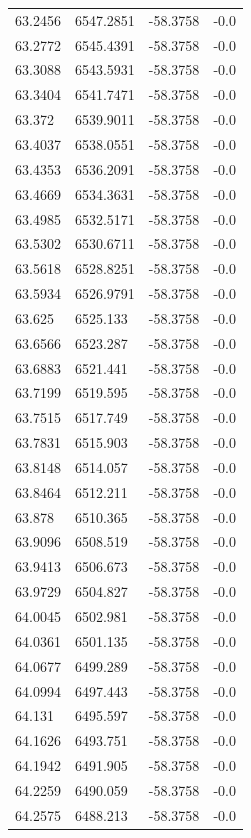 \begin{table}[H]
\begin{tabular}{llll}
63.2456 & 6547.2851 & -58.3758 & -0.0 \\
63.2772 & 6545.4391 & -58.3758 & -0.0 \\
63.3088 & 6543.5931 & -58.3758 & -0.0 \\
63.3404 & 6541.7471 & -58.3758 & -0.0 \\
63.372 & 6539.9011 & -58.3758 & -0.0 \\
63.4037 & 6538.0551 & -58.3758 & -0.0 \\
63.4353 & 6536.2091 & -58.3758 & -0.0 \\
63.4669 & 6534.3631 & -58.3758 & -0.0 \\
63.4985 & 6532.5171 & -58.3758 & -0.0 \\
63.5302 & 6530.6711 & -58.3758 & -0.0 \\
63.5618 & 6528.8251 & -58.3758 & -0.0 \\
63.5934 & 6526.9791 & -58.3758 & -0.0 \\
63.625 & 6525.133 & -58.3758 & -0.0 \\
63.6566 & 6523.287 & -58.3758 & -0.0 \\
63.6883 & 6521.441 & -58.3758 & -0.0 \\
63.7199 & 6519.595 & -58.3758 & -0.0 \\
63.7515 & 6517.749 & -58.3758 & -0.0 \\
63.7831 & 6515.903 & -58.3758 & -0.0 \\
63.8148 & 6514.057 & -58.3758 & -0.0 \\
63.8464 & 6512.211 & -58.3758 & -0.0 \\
63.878 & 6510.365 & -58.3758 & -0.0 \\
63.9096 & 6508.519 & -58.3758 & -0.0 \\
63.9413 & 6506.673 & -58.3758 & -0.0 \\
63.9729 & 6504.827 & -58.3758 & -0.0 \\
64.0045 & 6502.981 & -58.3758 & -0.0 \\
64.0361 & 6501.135 & -58.3758 & -0.0 \\
64.0677 & 6499.289 & -58.3758 & -0.0 \\
64.0994 & 6497.443 & -58.3758 & -0.0 \\
64.131 & 6495.597 & -58.3758 & -0.0 \\
64.1626 & 6493.751 & -58.3758 & -0.0 \\
64.1942 & 6491.905 & -58.3758 & -0.0 \\
64.2259 & 6490.059 & -58.3758 & -0.0 \\
64.2575 & 6488.213 & -58.3758 & -0.0 \\

\end{tabular}
\end{table}
